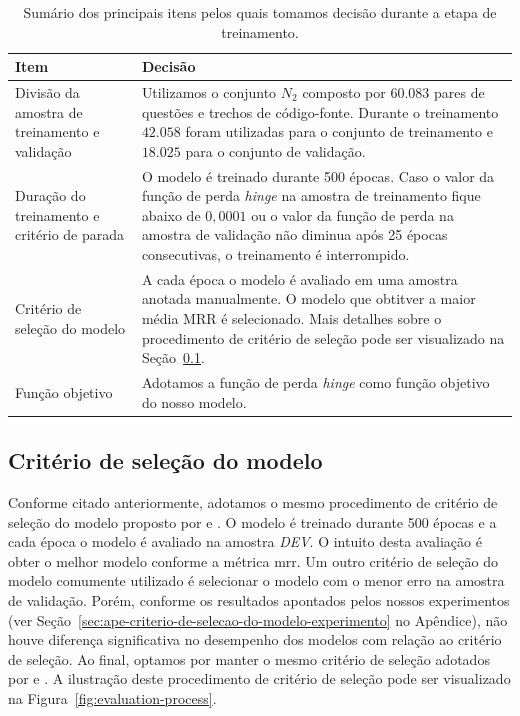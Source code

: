 \begin{table}[h]
\centering
\begin{tabular}{ | p{5cm} | p{10cm} |  }
\hline
\textbf{Item} & \textbf{Decisão} \\
\hline
 Divisão da amostra de treinamento e validação & Utilizamos o conjunto $N_{2}$ composto por $60.083$ pares de questões e trechos de código-fonte. Durante o treinamento $42.058$ foram utilizadas para o conjunto de treinamento e $18.025$ para o conjunto de validação.\\


\hline
 
Duração do treinamento e critério de parada & O modelo é treinado durante 500 épocas. Caso o valor da função de perda \textit{hinge} na amostra de treinamento fique abaixo de $0,0001$ ou o valor da função de perda na amostra de validação não diminua após 25 épocas consecutivas, o treinamento é interrompido.\\

 \hline
Critério de seleção do modelo & A cada época o modelo é avaliado em uma amostra anotada manualmente. O modelo que obtitver a maior média MRR é selecionado. Mais detalhes sobre o procedimento de critério de seleção pode ser visualizado na Seção~\ref{sec:criterio-selecao-modelo-treinamento}.\\
 
 \hline
 
 Função objetivo & Adotamos a função de perda \textit{hinge} como função objetivo do nosso modelo. \\
 
  \hline
 
\end{tabular}
\caption{Sumário dos principais itens pelos quais tomamos decisão durante a etapa de treinamento.}
\label{table:training-decisions}
\end{table}

\subsection{Critério de seleção do modelo}
\label{sec:criterio-selecao-modelo-treinamento}

Conforme citado anteriormente, adotamos o mesmo procedimento de critério de seleção do modelo proposto por \cite{iyer-etal-2016-summarizing} e \cite{yao-2018}. O modelo é treinado durante 500 épocas e a cada época o modelo é avaliado na amostra \emph{DEV}. O intuito desta avaliação é obter o melhor modelo conforme a métrica \acrshort{mrr}. Um outro critério de seleção do modelo comumente utilizado é selecionar o modelo com o menor erro na amostra de validação. Porém, conforme os resultados apontados pelos nossos experimentos (ver Seção~\ref{sec:ape-criterio-de-selecao-do-modelo-experimento} no Apêndice), não houve diferença significativa no desempenho dos modelos com relação ao critério de seleção. Ao final, optamos por manter o mesmo critério de seleção adotados por \cite{iyer-etal-2016-summarizing} e \cite{yao-2018}. A ilustração deste procedimento de critério de seleção pode ser visualizado na Figura~\ref{fig:evaluation-process}.

